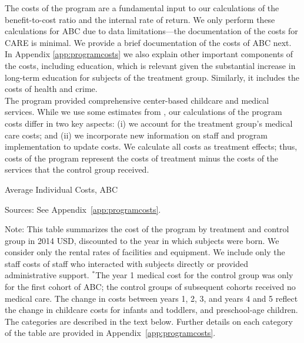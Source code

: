 \noindent The costs of the program are a fundamental input to our calculations of the benefit-to-cost ratio and the internal rate of return. We only perform these calculations for ABC due to data limitations---the documentation of the costs for  CARE is minimal. We provide a brief documentation of the costs of ABC next. In Appendix \ref{app:programcosts} we also explain other important components of the costs, including education, which is relevant given the substantial increase in long-term education for subjects of the treatment group. Similarly, it includes the costs of health and crime.\\


\noindent The program provided comprehensive center-based childcare and medical services. While we use some estimates from \cite{Masse_Barnett_2002_BOOKBenefitCostAnalysis}, our calculations of the program costs differ in two key aspects: (i) we account for the treatment group's medical care costs; and (ii) we incorporate new information on staff and program implementation to update costs. We calculate all costs as treatment effects; thus, costs of the program represent the costs of treatment minus the costs of the services that the control group received.\\

\begin{table}[H]
\begin{threeparttable}
\caption{Average Individual Costs, ABC} \label{tab:totalcosts}
\footnotesize

\begin{tablenotes}
\footnotesize
\item Sources: See Appendix~\ref{app:programcosts}.\\
\item Note: This table summarizes the cost of the program by treatment and control group in 2014 USD, discounted to the year in which subjects were born. We consider only the rental rates of facilities and equipment. We include only the staff costs of staff who interacted with subjects directly or provided administrative support. $^{*}$The year 1 medical cost for the control group was only for the first cohort of ABC; the control groups of subsequent cohorts received no medical care. The change in costs between years 1, 2, 3, and years 4 and 5 reflect the change in childcare costs for infants and toddlers, and preschool-age children. The categories are described in the text below. Further details on each category of the table are provided in Appendix~\ref{app:programcosts}.
\end{tablenotes}
\end{threeparttable}
\end{table}


